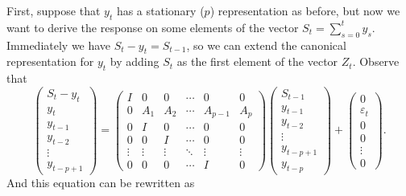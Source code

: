\documentclass[12pt,fleqn]{article}
\newcommand{\vep}{\varepsilon}
\begin{document}
First, suppose that $y_t$ has a stationary \VAR($p$) representation as
before, but now we want to derive the response on some elements of the
vector $S_t = \sum_{s=0}^t y_s$. Immediately we have $S_t - y_t =
S_{t-1}$, so we can extend the canonical representation for $y_t$ by
adding $S_t$ as the first element of the vector $Z_t$. Observe that
\begin{equation*}
  \begin{pmatrix}
    S_t - y_t \\ y_t \\ y_{t-1} \\ y_{t-2} \\ \vdots \\ y_{t-p+1}
  \end{pmatrix}
  =
  \begin{pmatrix}
    I & 0 & 0 & \cdots & 0 & 0 \\
    0 & A_1 & A_2 & \cdots & A_{p-1} & A_p \\
    0 & I   & 0 & \cdots & 0 & 0 \\
    0 & 0   & I & \cdots & 0 & 0 \\
    \vdots & \vdots & \vdots & \ddots & \vdots & \vdots \\
    0 & 0 & 0 & \cdots & I & 0
  \end{pmatrix}
  \begin{pmatrix}
    S_{t-1}  \\ y_{t-1} \\ y_{t-2} \\ \vdots \\ y_{t-p+1} \\ y_{t-p}
  \end{pmatrix}
  +
  \begin{pmatrix}
    0 \\ \vep_t \\ 0 \\ 0 \\ \vdots \\ 0
  \end{pmatrix}.
\end{equation*}
And this equation can be rewritten as
\end{document}
